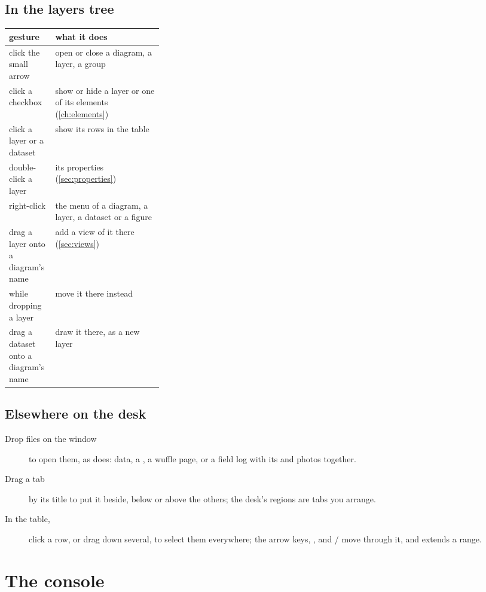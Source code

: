 \subsection{In the layers tree}

\begin{center}\small
\begin{tabularx}{\linewidth}{@{}>{\raggedright}p{0.3\linewidth}L@{}}\toprule
\sffamily\bfseries gesture & \sffamily\bfseries what it does \\\midrule
click the small arrow & open or close a diagram, a layer, a group \\
click a checkbox & show or hide a layer or one of its elements (\cref{ch:elements}) \\
click a layer or a dataset & show its rows in the table \\
double-click a layer & its properties (\cref{sec:properties}) \\
right-click & the menu of a diagram, a layer, a dataset or a figure \\
drag a layer onto a diagram's name & add a view of it there (\cref{sec:views}) \\
 while dropping a layer & move it there instead \\
drag a dataset onto a diagram's name & draw it there, as a new layer \\
\bottomrule\end{tabularx}
\end{center}

\subsection{Elsewhere on the desk}

\begin{description}
\item[Drop files on the window] to open them, as  does: data, a
, a wuffle page, or a field log with its  and photos together.
\item[Drag a tab] by its title to put it beside, below or above the others; the desk's regions are
tabs you arrange.
\item[In the table,] click a row, or drag down several, to select them everywhere; the arrow keys,
,  and / move through it, and  extends a range.
\end{description}

\section{The console}

